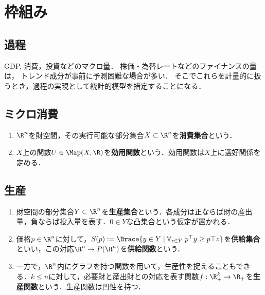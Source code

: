 \documentclass[uplatex,dvipdfmx]{jsreport}
\begin{document}
\section{枠組み}

\subsection{過程}

\begin{tcolorbox}[colframe=ForestGreen, colback=ForestGreen!10!white,breakable,colbacktitle=ForestGreen!40!white,coltitle=black,fonttitle=\bfseries\sffamily,
title=]
    GDP, 消費，投資などのマクロ量．
    株価・為替レートなどのファイナンスの量は，
    トレンド成分が事前に予測困難な場合が多い．
    そこでこれらを計量的に扱うとき，過程の実現として統計的模型を措定することになる．
\end{tcolorbox}

\subsection{ミクロ消費}

\begin{definition}\mbox{}
    \begin{enumerate}
        \item $\R^n$を財空間，その実行可能な部分集合$X\subset\R^n$を\textbf{消費集合}という．
        \item $X$上の関数$U\in\Map(X,\R)$を\textbf{効用関数}という．効用関数は$X$上に選好関係を定める．
    \end{enumerate}
\end{definition}

\subsection{生産}

\begin{definition}\mbox{}
    \begin{enumerate}
        \item 財空間の部分集合$Y\subset\R^n$を\textbf{生産集合}という．各成分は正ならば財の産出量，負ならば投入量を表す．$0\in Y$な凸集合という仮定が置かれる．
        \item 価格$p\in\R^n$に対して，$S(p):=\Brace{y\in Y\mid\forall_{z\in Y}\;p^\top y\ge p\top z}$を\textbf{供給集合}といい，この対応$\R^n\to P(\R^n)$を\textbf{供給関数}という．
        \item 一方で，$\R^n$内にグラフを持つ関数を用いて，生産性を捉えることもできる．$k\le n$に対して，必要財と産出財との対応を表す関数$f:\R^k_+\to\R_+$を\textbf{生産関数}という．生産関数は凹性を持つ．
    \end{enumerate}
\end{definition}
\end{document}

